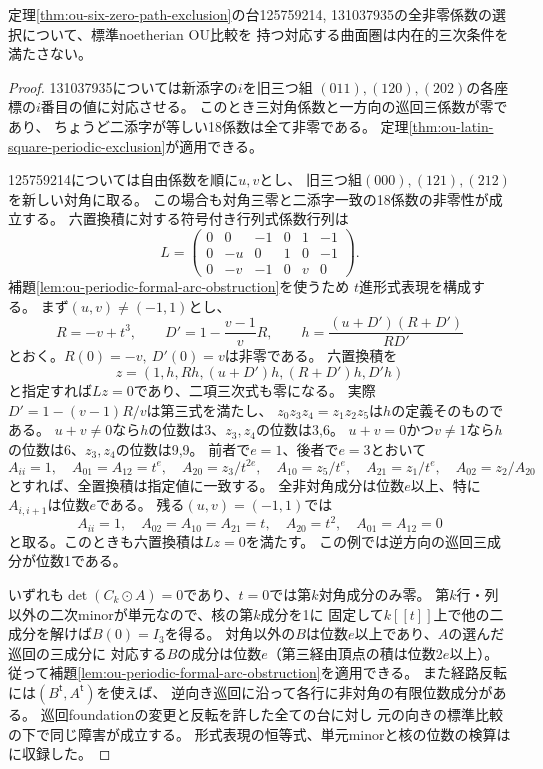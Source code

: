 \begin{theorem}[125759214と131037935の内在的排除]
\label{thm:ou-six-zero-periodic-exclusion}
定理\ref{thm:ou-six-zero-path-exclusion}の台125759214,
131037935の全非零係数の選択について、標準noetherian OU比較を
持つ対応する曲面圏は内在的三次条件を満たさない。
\end{theorem}
\begin{proof}
131037935については新添字の$i$を旧三つ組
$(011),(120),(202)$の各座標の$i$番目の値に対応させる。
このとき三対角係数と一方向の巡回三係数が零であり、
ちょうど二添字が等しい18係数は全て非零である。
定理\ref{thm:ou-latin-square-periodic-exclusion}が適用できる。

125759214については自由係数を順に$u,v$とし、
旧三つ組$(000),(121),(212)$を新しい対角に取る。
この場合も対角三零と二添字一致の18係数の非零性が成立する。
六置換積に対する符号付き行列式係数行列は
\[
 L=\begin{pmatrix}
 0&0&-1&0&1&-1\\
 0&-u&0&1&0&-1\\
 0&-v&-1&0&v&0
 \end{pmatrix}.
\]
補題\ref{lem:ou-periodic-formal-arc-obstruction}を使うため
$t$進形式表現を構成する。
まず$(u,v)\ne(-1,1)$とし、
\[
 R=-v+t^3,\qquad D'=1-\frac{v-1}{v}R,\qquad
 h=\frac{(u+D')(R+D')}{RD'}
\]
とおく。$R(0)=-v,\ D'(0)=v$は非零である。
六置換積を
\[
 z=(1,h,Rh,(u+D')h,(R+D')h,D'h)
\]
と指定すれば$Lz=0$であり、二項三次式も零になる。
実際$D'=1-(v-1)R/v$は第三式を満たし、
$z_0z_3z_4=z_1z_2z_5$は$h$の定義そのものである。
$u+v\ne0$なら$h$の位数は3、$z_3,z_4$の位数は3,6。
$u+v=0$かつ$v\ne1$なら$h$の位数は6、$z_3,z_4$の位数は9,9。
前者で$e=1$、後者で$e=3$とおいて
\[
 A_{ii}=1,\quad A_{01}=A_{12}=t^e,\quad
 A_{20}=z_3/t^{2e},\quad A_{10}=z_5/t^e,\quad
 A_{21}=z_1/t^e,\quad A_{02}=z_2/A_{20}
\]
とすれば、全置換積は指定値に一致する。
全非対角成分は位数$e$以上、特に$A_{i,i+1}$は位数$e$である。
残る$(u,v)=(-1,1)$では
\[
 A_{ii}=1,\quad A_{02}=A_{10}=A_{21}=t,\quad
 A_{20}=t^2,\quad A_{01}=A_{12}=0
\]
と取る。このときも六置換積は$Lz=0$を満たす。
この例では逆方向の巡回三成分が位数1である。

いずれも$\det(C_k\odot A)=0$であり、$t=0$では第$k$対角成分のみ零。
第$k$行・列以外の二次minorが単元なので、核の第$k$成分を1に
固定して$k[[t]]$上で他の二成分を解けば$B(0)=I_3$を得る。
対角以外の$B$は位数$e$以上であり、$A$の選んだ巡回の三成分に
対応する$B$の成分は位数$e$（第三経由頂点の積は位数$2e$以上）。
従って補題\ref{lem:ou-periodic-formal-arc-obstruction}を適用できる。
また経路反転には$(B^{\mathsf t},A^{\mathsf t})$を使えば、
逆向き巡回に沿って各行に非対角の有限位数成分がある。
巡回foundationの変更と反転を許した全ての台に対し
元の向きの標準比較の下で同じ障害が成立する。
形式表現の恒等式、単元minorと核の位数の検算は
に収録した。
\end{proof}

